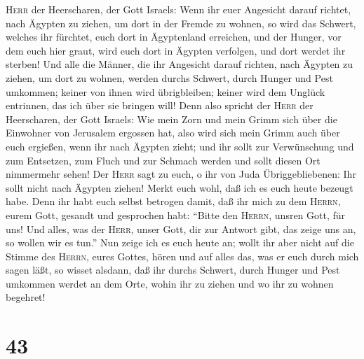 \textsc{Herr} der Heerscharen, der Gott Israels: Wenn ihr euer Angesicht
darauf richtet, nach Ägypten zu ziehen, um dort in der Fremde zu wohnen,
 so wird das Schwert, welches ihr fürchtet, euch dort in
Ägyptenland erreichen, und der Hunger, vor dem euch hier graut, wird
euch dort in Ägypten verfolgen, und dort werdet ihr sterben!
 Und alle die Männer, die ihr Angesicht darauf richten,
nach Ägypten zu ziehen, um dort zu wohnen, werden durchs Schwert, durch
Hunger und Pest umkommen; keiner von ihnen wird übrigbleiben; keiner
wird dem Unglück entrinnen, das ich über sie bringen will!
 Denn also spricht der \textsc{Herr} der Heerscharen, der
Gott Israels: Wie mein Zorn und mein Grimm sich über die Einwohner von
Jerusalem ergossen hat, also wird sich mein Grimm auch über euch
ergießen, wenn ihr nach Ägypten zieht; und ihr sollt zur Verwünschung
und zum Entsetzen, zum Fluch und zur Schmach werden und sollt diesen Ort
nimmermehr sehen!  Der \textsc{Herr} sagt zu euch, o ihr
von Juda Übriggebliebenen: Ihr sollt nicht nach Ägypten ziehen! Merkt
euch wohl, daß ich es euch heute bezeugt habe.  Denn ihr
habt euch selbst betrogen damit, daß ihr mich zu dem \textsc{Herrn},
eurem Gott, gesandt und gesprochen habt: ``Bitte den \textsc{Herrn},
unsren Gott, für uns! Und alles, was der \textsc{Herr}, unser Gott, dir
zur Antwort gibt, das zeige uns an, so wollen wir es tun.''
 Nun zeige ich es euch heute an; wollt ihr aber nicht auf
die Stimme des \textsc{Herrn}, eures Gottes, hören und auf alles das,
was er euch durch mich sagen läßt,  so wisset alsdann,
daß ihr durchs Schwert, durch Hunger und Pest umkommen werdet an dem
Orte, wohin ihr zu ziehen und wo ihr zu wohnen begehret!

\hypertarget{section-42}{%
\section{43}\label{section-42}}

